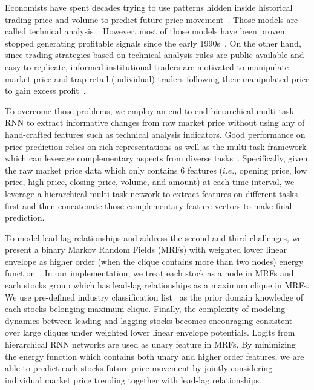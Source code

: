\documentclass[sigconf,anonymous,review]{acmart}
\renewcommand{\cite}{\citep}
\begin{document}
Economists have spent decades trying to use patterns hidden
inside historical trading price and volume to predict future
price movement~\cite{fama1966filter,jensen1967random}. Those
models are called technical
analysis~\cite{kirkpatrick2010technical}. However, most of those
models have been proven stopped generating profitable signals
since the early 1990s~\cite{park2007we}. On the other hand, since
trading strategies based on technical analysis rules are public
available and easy to replicate, informed institutional traders
are motivated to manipulate market price and trap retail
(individual) traders following their manipulated price to gain
excess profit~\cite{sun2016decision}.

To overcome those problems, we employ an end-to-end
hierarchical multi-task~\cite{caruana1993multitask} RNN to
extract informative changes from raw market price without using
any of hand-crafted features such as technical analysis
indicators. Good performance on price prediction relies on rich
representations as well as the multi-task framework which can leverage
complementary aspects from diverse tasks~\cite{sogaard2016deep}. Specifically, given the raw market price data which only contains 6 features ($i.e.$, opening
price, low price, high price, closing price, volume, and amount) at each time interval, we leverage a hierarchical multi-task
network to extract features on different tasks first and then concatenate those complementary feature vectors to make final prediction.

To model lead-lag relationships and address the second and third challenges, we present a
binary Markov Random Fields (MRFs) with weighted lower linear envelope as higher order (when the clique contains more than two
nodes) energy function~\cite{Kohli:CVPR07,Nowozin:2011,Gould:ICML2011,gouldlearning}.
In our implementation, we treat each stock as a node in MRFs and each stocks group which has lead-lag relationships as a maximum clique in MRFs. We use pre-defined industry classification
list~\cite{ths} as the prior domain knowledge of each stock\textquotesingle s belonging maximum clique. Finally, the
complexity of modeling dynamics between leading and lagging stocks becomes encouraging consistent over large cliques under
weighted lower linear envelope potentials. Logits from hierarchical RNN networks are used as unary feature in MRFs. By minimizing the energy function which contains both unary and higher order
features, we are able to predict each stock\textquotesingle s future price movement by jointly considering individual market
price trending together with lead-lag relationships.
\end{document}
